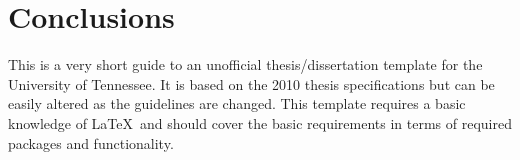 \chapter{Conclusions} \label{ch:conclusions}

This is a very short guide to an unofficial thesis/dissertation template for the University of Tennessee. It is based on the 2010 thesis specifications but can be easily altered as the guidelines are changed. This template requires a basic knowledge of \LaTeX\ and should cover the basic requirements in terms of required packages and functionality.

